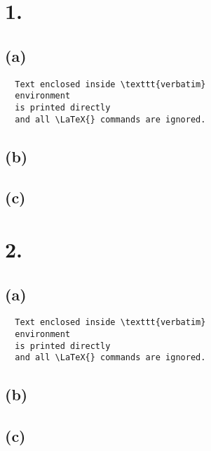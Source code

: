 \documentclass{article}
\begin{document}
\thispagestyle{firstpageheader}

\section*{1.}
{\Large 

\subsection*{(a)}

\begin{verbatim}
  Text enclosed inside \texttt{verbatim}
  environment 
  is printed directly 
  and all \LaTeX{} commands are ignored.
\end{verbatim}

\subsection*{(b)}


\subsection*{(c)}

}

\section*{2.}
{\Large

\subsection*{(a)}

\begin{verbatim}
  Text enclosed inside \texttt{verbatim}
  environment 
  is printed directly 
  and all \LaTeX{} commands are ignored.
\end{verbatim}

\subsection*{(b)}


\subsection*{(c)}

}
\end{document}

